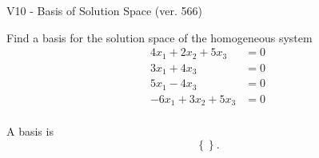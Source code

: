 \begin{exercise}
  \begin{exerciseTitle}V10 - Basis of Solution Space (ver. 566)\end{exerciseTitle}
  \begin{exerciseStatement}
    Find a basis for the solution space of the homogeneous system 
\begin{align*}
 4 x_ 1 + 2 x_ 2 + 5 x_ 3 &= 0  \\ 
  3 x_ 1 + 4 x_ 3 &= 0  \\ 
  5 x_ 1 -4 x_ 3 &= 0  \\ 
  -6 x_ 1 + 3 x_ 2 + 5 x_ 3 &= 0  \\ 
 \end{align*}


 
  \end{exerciseStatement}

  \begin{exerciseAnswer}
   A basis is   
\[\left\{\right\}.\]

  


  \end{exerciseAnswer}
\end{exercise}